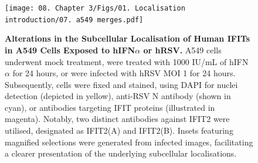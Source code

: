 \begin{figure}
    \centering
    \texttt{[image: 08. Chapter 3/Figs/01. Localisation introduction/07. a549 merges.pdf]}
    \caption[Alterations in the Subcellular Localisation of Human IFITs in A549 Cells Exposed to hIFN\(\alpha\) or hRSV.]{\textbf{Alterations in the Subcellular Localisation of Human IFITs in A549 Cells Exposed to hIFN\(\alpha\) or hRSV.} A549 cells underwent mock treatment, were treated with 1000 IU/mL of hIFN\(\alpha\) for 24 hours, or were infected with hRSV MOI 1 for 24 hours. Subsequently, cells were fixed and stained, using DAPI for nuclei detection (depicted in yellow), anti-RSV N antibody (shown in cyan), or antibodies targeting IFIT proteins (illustrated in magenta). Notably, two distinct antibodies against IFIT2 were utilised, designated as IFIT2(A) and IFIT2(B). Insets featuring magnified selections were generated from infected images, facilitating a clearer presentation of the underlying subcellular localisations.}
    \label{fig:Alterations in the Subcellular Localisation of Human IFITs in A549 Cells Exposed to hIFNa or hRSV}
\end{figure}

